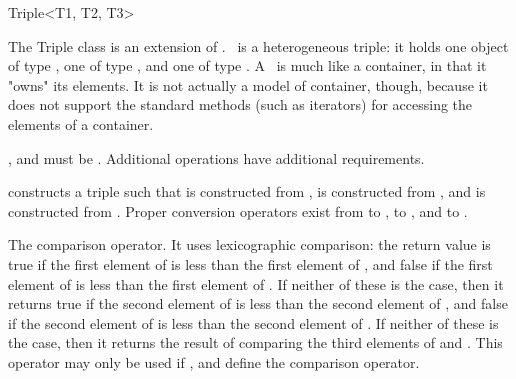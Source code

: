 \begin{ccRefClass}{Triple<T1, T2, T3>}
  
  \ccDefinition The Triple class is an extension of .
  \ccRefName\ is a heterogeneous triple: it holds one object of type
  , one of type , and one of type .  A
  \ccRefName\ is much like a container, in that it "owns" its
  elements. It is not actually a model of container, though, because
  it does not support the standard methods (such as iterators) for
  accessing the elements of a container.

  
  \ccRequirements {},  and  must be .
  Additional operations have additional requirements.


  \ccTypes
  \ccGlue
  \ccGlue

  \ccGlue
  \ccGlue

  \ccCreation
  
  
  
   {constructs a triple such that  is constructed
    from ,  is constructed from , and
     is constructed from . \ccRequire Proper
    conversion operators exist from  to ,  to
    , and  to .}

   {The
    comparison operator. It uses lexicographic comparison: the return
    value is true if the first element of  is less than the
    first element of , and false if the first element of
     is less than the first element of . If neither of
    these is the case, then it returns true if the second element of
     is less than the second element of , and false if
    the second element of  is less than the second element of
    .  If neither of these is the case, then it returns the
    result of comparing the third elements of  and .
    This operator may only be used if ,  and 
    define the comparison operator.}
  

\end{ccRefClass}
